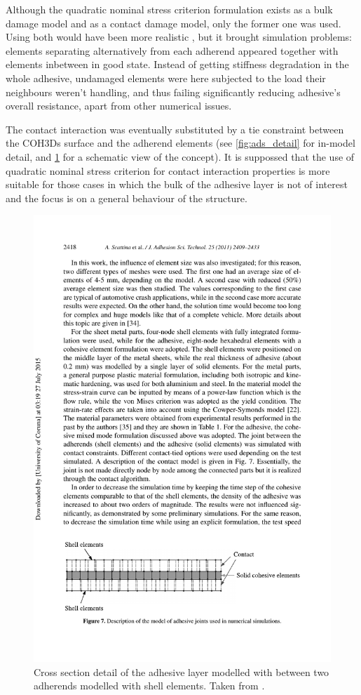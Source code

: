 \documentclass[
documentsize = a4, %
font = cmr, %
typesize = 11, %
printmode = true,
onehalfspacing = true,
language = en, %
titlepage = udciccp, %
degree = pt, %
dedication = true,
acknowledgements = true,
abstract-en = true,
abstract-es = false,
abstract-ga = false,
epigraphs = true,
toc = true,
lof = true,
lot = true,
frontmatterintoc = false,
notation = false,
minimal = false,
]{UDCthesis}
\begin{document}
Although the quadratic nominal stress criterion formulation exists as a bulk damage model and as a contact damage model, only the former one was used. Using both would have been more realistic \citep{Wu2013}, but it brought simulation problems: elements separating alternatively from each adherend appeared together with elements inbetween in good state. Instead of getting stiffness degradation in the whole adhesive, undamaged elements were here subjected to the load their neighbours weren't handling, and thus failing significantly reducing adhesive's overall resistance, apart from other numerical issues.

The contact interaction was eventually substituted by a tie constraint between the \glspl{COH3D} surface and the adherend elements (see \cref{fig:ads_detail} for in-model detail, and \cref{fig:union} for a schematic view of the concept). It is suppossed that the use of quadratic nominal stress criterion for contact interaction properties is more suitable for those cases in which the bulk of the adhesive layer is not of interest and the focus is on a general behaviour of the structure.

\begin{figure}
	\centering
	\includegraphics[width=0.7\linewidth]{IMG_CUTRES/union}
	\caption[Cross section detail of the adhesive layer modelled with  between two adherends modelled with shell elements.]{Cross section detail of the adhesive layer modelled with  between two adherends modelled with shell elements. Taken from \citet{Scattina2011}.}
	\label{fig:union}
\end{figure}
\end{document}
